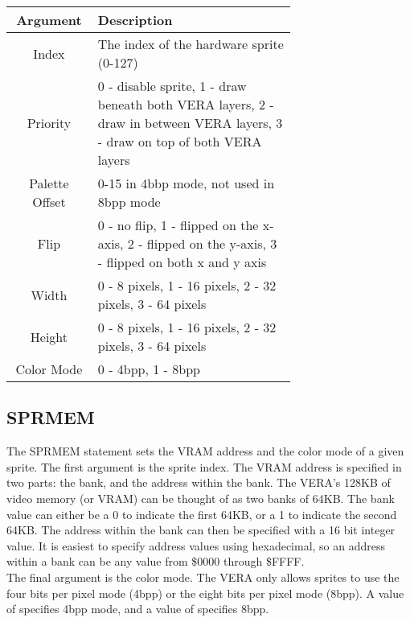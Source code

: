 \begin{tabular}{|c|p{0.7\linewidth}|}
	\hline

	Argument & {\bfseries Description}\\ \hline

	Index & The index of the hardware sprite (0-127)\\ \hline

	Priority & 0 - disable sprite, 1 - draw beneath both VERA
	layers, 2 - draw in between VERA layers, 3 - draw on top of both VERA
	layers\\ \hline

	Palette Offset  & 0-15 in 4bbp mode, not used in 8bpp mode\\ \hline

	Flip & 0 - no flip, 1 - flipped on the x-axis, 2 - flipped on
	the y-axis, 3 - flipped on both x and y axis\\ \hline

	Width & 0 - 8 pixels, 1 - 16 pixels, 2 - 32 pixels, 3 - 64
	pixels\\ \hline

	Height & 0 - 8 pixels, 1 - 16 pixels, 2 - 32 pixels, 3 - 64
	pixels\\ \hline

	Color Mode & 0 - 4bpp, 1 - 8bpp\\ \hline

\end{tabular}

\subsection{SPRMEM}

The {\ttfamily SPRMEM} statement sets the VRAM address and the color mode of a
given sprite.  The first argument is the sprite index.  The VRAM address is
specified in two parts: the bank, and the address within the bank.  The VERA's
128KB of video memory (or VRAM) can be thought of as two banks of 64KB.  The
bank value can either be a 0 to indicate the first 64KB, or a 1 to indicate the
second 64KB.  The address within the bank can then be specified with a 16 bit
integer value.  It is easiest to specify address values using hexadecimal, so
an address within a bank can be any value from \$0000 through \$FFFF.\\

The final argument is the color mode.  The VERA only allows sprites to use the
four bits per pixel mode (4bpp) or the eight bits per pixel mode (8bpp).  A
value of {} specifies 4bpp mode, and a value of {}
specifies 8bpp.\\

